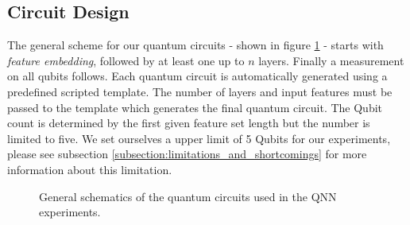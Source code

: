 \clearpage

\subsection{Circuit Design}
The general scheme for our quantum circuits - shown in figure \ref{figure:general_schematics_quantum_circuits_qnn} - starts with \textit{feature embedding}, followed by at least one up to $n$ layers. Finally a measurement on all qubits follows. Each quantum circuit is automatically generated using a predefined scripted template. The number of layers and input features must be passed to the template which generates the final quantum circuit. The Qubit count is determined by the first given feature set length but the number is limited to five. We set ourselves a upper limit of 5 Qubits for our experiments, please see subsection \ref{subsection:limitations_and_shortcomings} for more information about this limitation.

\begin{figure}[!h]
	\centering
	\caption{General schematics of the quantum circuits used in the QNN experiments.}
	\label{figure:general_schematics_quantum_circuits_qnn}
\end{figure}


